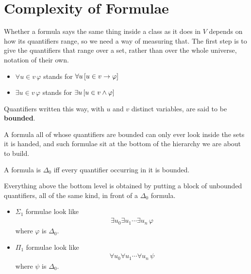 \section{Complexity of Formulae}

Whether a formula says the same thing inside a class as it does in $V$ depends on how its quantifiers range, so we need a way of measuring that. The first step is to give the quantifiers that range over a set, rather than over the whole universe, notation of their own.

\begin{boxnotation} \hfill
    \begin{itemize}
        \item $\forall u \in v \, \varphi$ stands for $\forall u \left[ u \in v \to \varphi \right]$

        \item $\exists u \in v \, \varphi$ stands for $\exists u \left[ u \in v \land \varphi \right]$
    \end{itemize}
    Quantifiers written this way, with $u$ and $v$ distinct variables, are said to be \textbf{bounded}.
\end{boxnotation}

A formula all of whose quantifiers are bounded can only ever look inside the sets it is handed, and such formulae sit at the bottom of the hierarchy we are about to build.

\begin{boxdefinition}
    A formula is $\Delta_0$ iff every quantifier occurring in it is bounded.
\end{boxdefinition}

Everything above the bottom level is obtained by putting a block of unbounded quantifiers, all of the same kind, in front of a $\Delta_0$ formula.

\begin{boxdefinition} \hfill
    \begin{itemize}
        \item $\Sigma_1$ formulae look like
        \begin{align*}
            \exists u_0 \exists u_1 \cdots \exists u_n \, \varphi
        \end{align*}
        where $\varphi$ is $\Delta_0$.

        \item $\Pi_1$ formulae look like
        \begin{align*}
            \forall u_0 \forall u_1 \cdots \forall u_n \, \psi
        \end{align*}
        where $\psi$ is $\Delta_0$.
    \end{itemize}
\end{boxdefinition}

